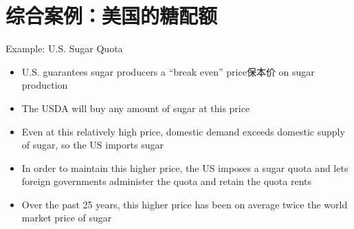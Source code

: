 \documentclass[10pt,hyperref={CJKbookmarks=true},xcolor=dvipsnames,aspectratio=169]{beamer}
\begin{document}



\section{综合案例：美国的糖配额}

\begin{frame}{Example: U.S. Sugar Quota}

\begin{itemize}
\item U.S. guarantees sugar producers a “break even” price保本价 on sugar production 
\item The USDA will buy any amount of sugar at this price 
\item Even at this relatively high price, domestic demand exceeds domestic
supply of sugar, so the US imports sugar 
\item In order to maintain this higher price, the US imposes a sugar quota
and lets foreign governments administer the quota and retain the quota
rents 
\item Over the past 25 years, this higher price has been on average twice
the world market price of sugar
\end{itemize}
\end{frame}
\end{document}
